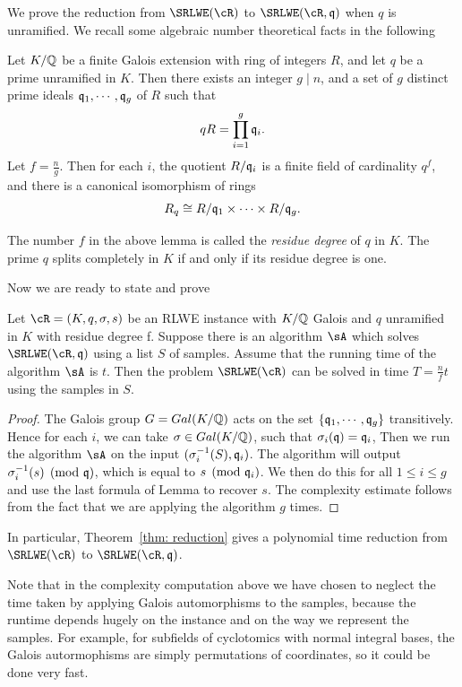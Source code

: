 \documentclass{amsart}
\begin{document}
We prove the reduction from $\SRLWE(\cR)$ to $\SRLWE(\cR,\fq)$ when
$q$ is unramified. We recall some algebraic number theoretical facts in the following
\begin{Lemma}
\label{lem: prime factorization}
Let $K/\mathbb{Q}$ be a finite Galois extension with ring of integers $R$,  and let $q$ be a prime unramified in $K$. Then there exists an integer $g \mid n$, and a set of $g$ distinct prime ideals $\mathfrak{q}_1, \cdots ,\mathfrak{q}_g$ of
$R$ such that
\[
    qR = \prod_{i=1}^g \mathfrak{q}_i.
\]
Let $f = \frac{n}{g}$. Then for each $i$, the quotient $R/\mathfrak{q}_{i}$ is a finite field of cardinality $q^f$, and there is a canonical isomorphism of rings
\[
    R_q \cong R/\mathfrak{q}_{1} \times \cdots \times R/\mathfrak{q}_{g}.
\]
\end{Lemma}
The number $f$ in the above lemma is called the {\it residue degree} of $q$ in $K$. The prime $q$ splits completely in $K$ if and only if its residue degree is one.

Now we are ready to state and prove
\begin{theorem} \label{thm: reduction}
Let $\cR = (K,q,\sigma, s)$ be an RLWE instance with $K/\mathbb{Q}$ Galois and $q$ unramified in $K$ with residue degree f. Suppose there is an algorithm $\sA$ which solves $\SRLWE(\cR,\fq)$ using a list $S$ of samples. Assume that the running time of the algorithm $\sA$ is $t$. Then the problem $\SRLWE(\cR)$ can be solved in time $T = \frac{n}{f}t$ using the samples in $S$.
\end{theorem}

\begin{proof}
The Galois group $G =Gal(K/\mathbb{Q})$ acts on the set $\{\mathfrak{q}_1, \cdots ,\mathfrak{q}_g\}$ transitively. Hence for each $i$, we can take $\sigma \in Gal(K/\mathbb{Q})$, such that $\sigma_i(\mathfrak{q}) = \mathfrak{q}_i$, Then we run the algorithm $\sA$ on the input $(\sigma_i^{-1}(S), \mathfrak{q}_i)$. The algorithm will output $\sigma_i^{-1}(s) \pmod{\mathfrak{q}}$, which is equal to $s \pmod{\mathfrak{q}_i}$. We then do this for all $1\leq i \leq g$ and use the last formula of Lemma to recover $s$. The complexity estimate follows from the fact that we are applying the algorithm $g$ times.
\end{proof}

In particular, Theorem~\ref{thm: reduction} gives a polynomial time reduction from $\SRLWE(\cR)$ to $\SRLWE(\cR,\fq)$.

\begin{remark}
Note that in the complexity computation above we have chosen to neglect the time taken by applying Galois automorphisms to the samples, because the runtime depends
hugely on the instance and on the way we represent the samples. For example, for subfields of cyclotomics with normal integral bases, the Galois autormophisms are simply permutations of coordinates, so it could be done very fast.
\end{remark}
\end{document}

